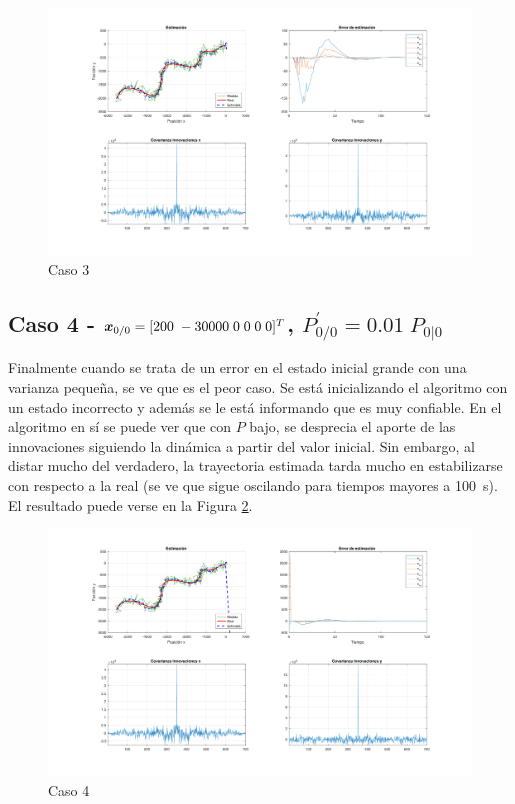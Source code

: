 		\begin{figure}[H]
			\centering
			\includegraphics[scale=0.5,trim={6,5cm 0 0 0}]{Figuras/graf_ej3c.pdf}
			\caption{Caso 3}
			\label{fig:ej3c}
		\end{figure}
	
	\subsection{Caso 4 - $\boldsymbol{x}_{0/0} = [200\;-30000\;0\;0\;0\;0]^T$, $P^{'}_{0/0}=\num{0.01}\; P_{0|0}$} \label{sec:ej3d}
	
	Finalmente cuando se trata de un error en el estado inicial grande con una varianza pequeña, se ve que es el peor caso. Se está inicializando el algoritmo con un estado incorrecto y además se le está informando que es muy confiable. En el algoritmo en sí se puede ver que con $P$ bajo, se desprecia el aporte de las innovaciones siguiendo la dinámica a partir del valor inicial. Sin embargo, al distar mucho del verdadero, la trayectoria estimada tarda mucho en estabilizarse con respecto a la real (se ve que sigue oscilando para tiempos mayores a \SI{100}{\s}). El resultado puede verse en la Figura \ref{fig:ej3d}.
	
		\begin{figure}[H]
			\centering
			\includegraphics[scale=0.5,trim={6,5cm 0 0 0}]{Figuras/graf_ej3d.pdf}
			\caption{Caso 4}
			\label{fig:ej3d}
		\end{figure}
		
%	
%
%	
	
